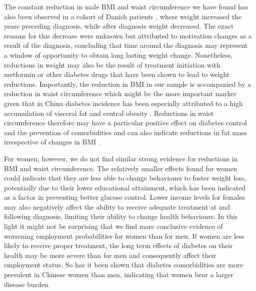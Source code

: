 The constant reduction in male \ac{BMI} and waist circumference we have found has also been observed in a cohort of Danish patients \autocite{DeFineOlivarius2015}, where weight increased the years preceding diagnosis, while after diagnosis weight decreased. The exact reasons for this decrease were unknown but attributed to motivation changes as a result of the diagnosis, concluding that time around the diagnosis may represent a window of opportunity to obtain long lasting weight change. Nonetheless, reductions in weight may also be the result of treatment initiation with metformin or other diabetes drugs that have been shown to lead to weight reductions.\autocite{Yang2014} Importantly, the reduction in \ac{BMI} in our sample is accompanied by a reduction in waist circumference which might be the more important marker given that in China diabetes incidence has been especially attributed to a high accumulation of visceral fat and central obesity \autocite{Ma2014}. Reductions in waist circumference therefore may have a particular positive effect on diabetes control and the prevention of comorbidities and can also indicate reductions in fat mass irrespective of changes in \ac{BMI} \autocite{Klein2007}.

For women, however, we do not find similar strong evidence for reductions in \ac{BMI} and waist circumference. The relatively smaller effects found for women could indicate that they are less able to change behaviours to foster weight loss, potentially due to their lower educational attainment, which has been indicated as a factor in preventing better glucose control.\autocite{Luo2015} Lower income levels for females may also negatively affect the ability to receive adequate treatment at and following diagnosis, limiting their ability to change health behaviours.\autocite{Luo2015} In this light it might not be surprising that we find more conclusive evidence of worsening employment probabilities for women than for men. If women are less likely to receive proper treatment, the long term effects of diabetes on their health may be more severe than for men and consequently affect their employment status. So has it been shown that diabetes comorbidities are more prevalent in Chinese women than men, indicating that women bear a larger disease burden.\autocite{Liu2010} 

